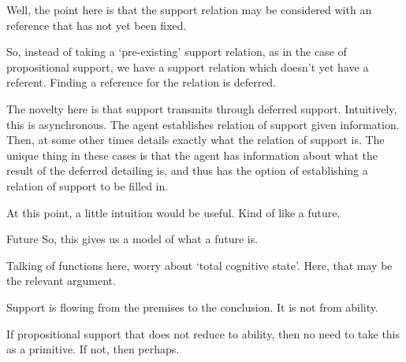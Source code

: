 \begin{note}[Support]
  Well, the point here is that the support relation may be considered with an reference that has not yet been fixed.

  So, instead of taking a `pre-existing' support relation, as in the case of propositional support, we have a support relation which doesn't yet have a referent.
  Finding a reference for the relation is deferred.

  The novelty here is that support transmits through deferred support.
  Intuitively, this is asynchronous.
  The agent establishes relation of support given information.
  Then, at some other times details exactly what the relation of support is.
  The unique thing in these cases is that the agent has information about what the result of the deferred detailing is, and thus has the option of establishing a relation of support to be filled in.
\end{note}

\begin{note}[Intuition]
  At this point, a little intuition would be useful.
  Kind of like a future.
\end{note}



\begin{note}{Future}
  So, this gives us a model of what a future is.

  Talking of functions here, worry about `total cognitive state'.
  Here, that may be the relevant argument.
\end{note}

\begin{note}
  Support is flowing from the premises to the conclusion.
  It is not from ability.

  If propositional support that does not reduce to ability, then no need to take this as a primitive.
  If not, then perhaps.
\end{note}

